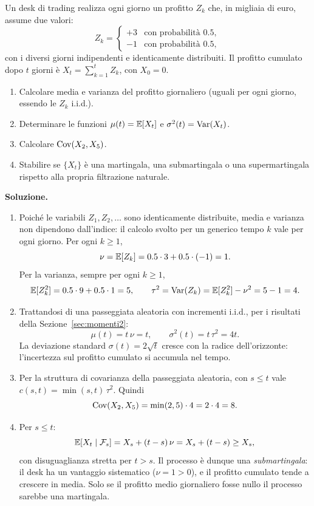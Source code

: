 \begin{exercise}
\label{ex:random-walk}
Un desk di trading realizza ogni giorno un profitto $Z_k$ che,
in migliaia di euro, assume due valori:
\[
Z_k=\begin{cases}
+3 & \text{con probabilit\`{a} }0.5,\\
-1 & \text{con probabilit\`{a} }0.5,
\end{cases}
\]
con i diversi giorni indipendenti e identicamente distribuiti. Il
profitto cumulato dopo $t$ giorni \`{e} $X_t=\sum_{k=1}^{t}Z_k$, con
$X_0=0$.
\begin{enumerate}
\item Calcolare media e varianza del profitto giornaliero (uguali per
ogni giorno, essendo le $Z_k$ i.i.d.).
\item Determinare le funzioni $\mu(t)=\mathbb{E}[X_t]$ e
$\sigma^2(t)=\operatorname{Var}(X_t)$.
\item Calcolare $\operatorname{Cov}(X_2,X_5)$.
\item Stabilire se $\{X_t\}$ \`{e} una martingala, una submartingala
o una supermartingala rispetto alla propria filtrazione naturale.
\end{enumerate}
\end{exercise}

\noindent
\textbf{Soluzione.}
\begin{enumerate}
\item Poich\'{e} le variabili $Z_1,Z_2,\ldots$ sono identicamente
distribuite, media e varianza non dipendono dall'indice: il calcolo
svolto per un generico tempo $k$ vale per ogni giorno. Per ogni
$k\geq 1$,
\[
\nu=\mathbb{E}[Z_k]=0.5\cdot 3+0.5\cdot(-1)=1.
\]
Per la varianza, sempre per ogni $k\geq 1$,
\[
\mathbb{E}[Z_k^2]=0.5\cdot 9+0.5\cdot 1=5,
\qquad
\tau^2=\operatorname{Var}(Z_k)=\mathbb{E}[Z_k^2]-\nu^2=5-1=4.
\]

\item Trattandosi di una passeggiata aleatoria con incrementi
i.i.d., per i risultati della Sezione~\ref{sec:momenti2}:
\[
\mu(t)=t\,\nu=t,
\qquad
\sigma^2(t)=t\,\tau^2=4t.
\]
La deviazione standard $\sigma(t)=2\sqrt{t}$ cresce con la radice
dell'orizzonte: l'incertezza sul profitto cumulato si accumula nel
tempo.

\item Per la struttura di covarianza della passeggiata aleatoria, con
$s\leq t$ vale $c(s,t)=\min(s,t)\,\tau^2$. Quindi
\[
\operatorname{Cov}(X_2,X_5)=\min(2,5)\cdot 4=2\cdot 4=8.
\]

\item Per $s\leq t$:
\[
\mathbb{E}[X_t\mid\mathcal{F}_s]=X_s+(t-s)\,\nu=X_s+(t-s)\geq X_s,
\]
con disuguaglianza stretta per $t>s$. Il processo \`{e} dunque una
\emph{submartingala}: il desk ha un vantaggio sistematico
($\nu=1>0$), e il profitto cumulato tende a crescere in media. Solo
se il profitto medio giornaliero fosse nullo il processo sarebbe una
martingala.
\end{enumerate}

